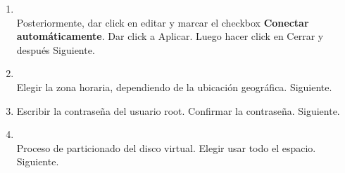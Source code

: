 \documentclass[11pt]{article}
\begin{document}
\begin{enumerate}
			\item
				\begin{minipage}[t]{\linewidth}
			          \raggedright
			          \medskip
			          \\Posteriormente, dar click en editar y marcar el checkbox \textbf{Conectar automáticamente}. Dar click a Aplicar. Luego hacer click en Cerrar y después Siguiente.
			    \end{minipage}	

			\item 
				\begin{minipage}[t]{\linewidth}
			          \raggedright
			          \medskip
			          \\Elegir la zona horaria, dependiendo de la ubicación geográfica. Siguiente. 
			    \end{minipage}	
			
			\item Escribir la contraseña del usuario root. Confirmar la contraseña. Siguiente.
			\item 
				\begin{minipage}[t]{\linewidth}
			          \raggedright
			          \medskip
			          \\Proceso de particionado del disco virtual. Elegir usar todo el espacio. Siguiente. 
			    \end{minipage}	


\end{enumerate}
\end{document}
